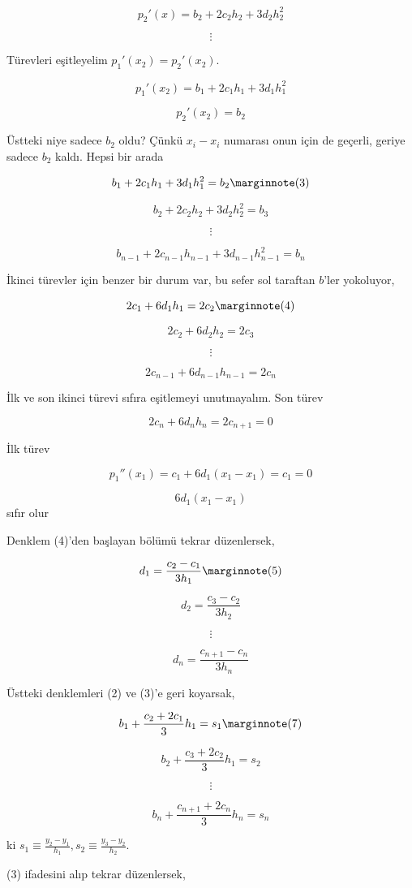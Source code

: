 \documentclass[12pt,fleqn]{article}\usepackage{../../common}
\begin{document}
$$ p_2'(x) = b_2 + 2c_2h_2 + 3d_2h_2^2 $$

$$ \vdots $$

Türevleri eşitleyelim $p_1'(x_2) = p_2'(x_2)$. 

$$ p_1'(x_2) = b_1 + 2c_1h_1 + 3d_1h_1^2 $$

$$  p_2'(x_2) = b_2 $$

Üstteki niye sadece $b_2$ oldu? Çünkü $x_i-x_i$ numarası onun için de
geçerli, geriye sadece $b_2$ kaldı. Hepsi bir arada

$$  b_1 + 2c_1h_1 + 3d_1h_1^2  = b_2 
\mlabel{3}$$

$$  b_2 + 2c_2h_2 + 3d_2h_2^2 = b_3 $$

$$ \vdots $$

$$  b_{n-1} + 2c_{n-1}h_{n-1} + 3d_{n-1}h_{n-1}^2 =  b_n $$

İkinci türevler için benzer bir durum var, bu sefer sol taraftan $b$'ler
yokoluyor, 

$$ 2c_1 + 6d_1h_1 = 2c_2 
\mlabel{4} $$

$$ 2c_2 + 6d_2h_2 = 2c_3 $$

$$ \vdots $$

$$ 2c_{n-1} + 6d_{n-1}h_{n-1} = 2c_n $$

İlk ve son ikinci türevi sıfıra eşitlemeyi unutmayalım. Son türev

$$ 2c_n + 6d_nh_n = 2c_{n+1} = 0 $$

İlk türev

$$ p_1''(x_1) =  c_1 + 6d_1(x_1-x_1)  = c_1 = 0$$

$$ 6d_1(x_1-x_1) $$ sıfır olur

Denklem (4)'den başlayan bölümü tekrar düzenlersek, 

$$ d_1 = \frac{ c_2 - c_1}{3h_1} 
\mlabel{5} $$

$$ d_2 = \frac{ c_3 - c_2}{3h_2} $$

$$ \vdots $$

$$ d_n = \frac{ c_{n+1} - c_n}{3h_n} $$

Üstteki denklemleri (2) ve (3)'e geri koyarsak,

$$ b_1 + \frac{ c_2 + 2c_1}{3}h_1 = s_1 
\mlabel{7} $$

$$ b_2 + \frac{ c_3 + 2c_2}{3}h_1 = s_2 $$

$$ \vdots $$

$$ b_n + \frac{ c_{n+1} + 2c_n}{3}h_n = s_n $$

ki $s_1 \equiv \frac{y_2 - y_1}{h_1}, s_2 \equiv \frac{y_3 - y_2}{h_2}$. 

(3) ifadesini alıp tekrar düzenlersek, 
\end{document}
